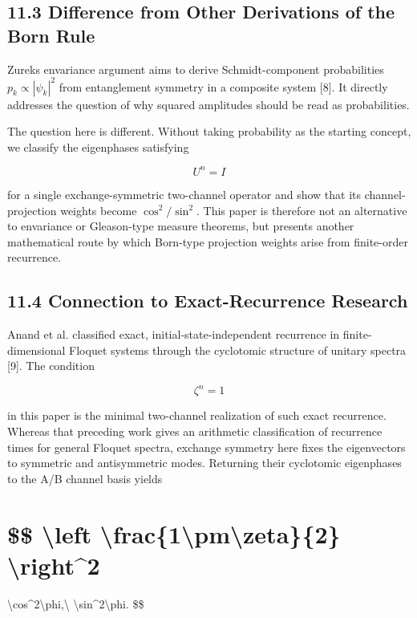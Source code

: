 \documentclass[
  a4paper,
  10pt]{article}
\begin{document}
\subsection{11.3 Difference from Other Derivations of the Born
Rule}\label{113-difference-from-other-derivations-of-the-born-rule}

Zurek\textquotesingle s envariance argument aims to derive
Schmidt-component probabilities \(p_k\propto|\psi_k|^2\) from
entanglement symmetry in a composite system {[}8{]}. It directly
addresses the question of why squared amplitudes should be read as
probabilities.

The question here is different. Without taking probability as the
starting concept, we classify the eigenphases satisfying

\[
U^n=I
\]

for a single exchange-symmetric two-channel operator and show that its
channel-projection weights become \(\cos^2/\sin^2\). This paper is
therefore not an alternative to envariance or Gleason-type measure
theorems, but presents another mathematical route by which Born-type
projection weights arise from finite-order recurrence.

\subsection{11.4 Connection to Exact-Recurrence
Research}\label{114-connection-to-exact-recurrence-research}

Anand et al. classified exact, initial-state-independent recurrence in
finite-dimensional Floquet systems through the cyclotomic structure of
unitary spectra {[}9{]}. The condition

\[
\zeta^n=1
\]

in this paper is the minimal two-channel realization of such exact
recurrence. Whereas that preceding work gives an arithmetic
classification of recurrence times for general Floquet spectra, exchange
symmetry here fixes the eigenvectors to symmetric and antisymmetric
modes. Returning their cyclotomic eigenphases to the A/B channel basis
yields

\section{\$\$ \textbackslash left\textbar{}
\textbackslash frac\{1\textbackslash pm\textbackslash zeta\}\{2\}
\textbackslash right\textbar\^{}2}\label{-left-frac1pmzeta2-right2}

\textbackslash cos\^{}2\textbackslash phi,\textbackslash{}
\textbackslash sin\^{}2\textbackslash phi. \$\$
\end{document}
